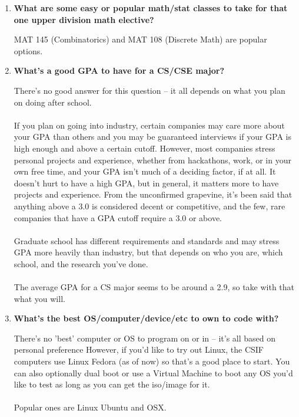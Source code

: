 \documentclass{article}
\begin{document}
\begin{enumerate}
    \item \textbf {What are some easy or popular math/stat classes to take for that one upper division math elective?}
    \begin{itemize}
        MAT 145 (Combinatorics) and MAT 108 (Discrete Math) are popular options. 
    \end{itemize}
    \item \textbf{What's a good GPA to have for a CS/CSE major?}
    \begin{itemize}
        There's no good answer for this question -- it all depends on what you plan on doing after school. \\\\
        If you plan on going into industry, certain companies may care more about your GPA than others and you may be guaranteed interviews if your GPA is high enough and above a certain cutoff. However, most companies stress personal projects and experience, whether from hackathons, work, or in your own free time, and your GPA isn't much of a deciding factor, if at all. It doesn't hurt to have a high GPA, but in general, it matters more to have projects and experience. From the unconfirmed grapevine, it's been said that anything above a 3.0 is considered decent or competitive, and the few, rare companies that have a GPA cutoff require a 3.0 or above.\\\\
        Graduate school has different requirements and standards and may stress GPA more heavily than industry, but that depends on who you are, which school, and the research you've done. \\\\
        The average GPA for a CS major seems to be around a 2.9, so take with that what you will.
    \end{itemize}
    \item \textbf{What's the best OS/computer/device/etc to own to code with?}
    \begin{itemize}
        There's no 'best' computer or OS to program on or in -- it's all based on personal preference However, if you'd like to try out Linux, the CSIF computers use Linux Fedora (as of now) so that's a good place to start. You can also optionally dual boot or use a Virtual Machine to boot any OS you'd like to test as long as you can get the iso/image for it. \\\\ Popular ones are Linux Ubuntu and OSX. 
    \end{itemize}
\end{enumerate}
\newpage
\end{document}
